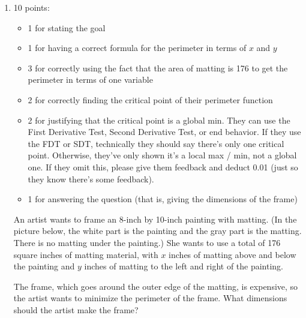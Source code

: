 \documentclass{article}
\begin{document}
\begin{enumerate}
\begin{enumerate}
  \end{enumerate}

\item %

  \begin{grading}
    10 points:
    \begin{itemize}[nosep]
    \item 1 for stating the goal
    \item 1 for having a correct formula for the perimeter in terms of $x$ and $y$
    \item 3 for correctly using the fact that the area of matting is 176 to get the perimeter in terms of one variable
    \item 2 for correctly finding the critical point of their perimeter function
    \item 2 for justifying that the critical point is a global min. They can use the First Derivative Test, Second Derivative Test, or end behavior. If they use the FDT or SDT, technically they should say there's only one critical point. Otherwise, they've only shown it's a local max / min, not a global one. If they omit this, please give them feedback and deduct 0.01 (just so they know there's some feedback). 
    \item 1 for answering the question (that is, giving the dimensions of the frame) 
    \end{itemize}
  \end{grading}

  \begin{problem}[\newpage]
    An artist wants to frame an 8-inch by 10-inch painting with matting. (In the picture below, the white part is the painting and the gray part is the matting. There is no matting under the painting.) She wants to use a total of 176 square inches of matting material, with $x$ inches of matting above and below the painting and $y$ inches of matting to the left and right of the painting.

    The frame, which goes around the outer edge of the matting, is expensive, so the artist wants to minimize the perimeter of the frame. What dimensions should the artist make the frame? 

  \end{problem}


\end{enumerate}
\end{document}

